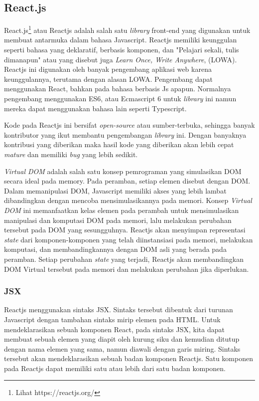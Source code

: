\subsection{React.js}
    React.js\footnote{Lihat https://reactjs.org/} atau Reactjs adalah salah satu
    \textit{library} front-end yang digunakan untuk membuat antarmuka
    \cite{facebook:react-homepage} dalam bahasa Javascript. Reactjs memiliki keunggulan
    seperti bahasa yang deklaratif, berbasis komponen, dan "Pelajari sekali,
    tulis dimanapun" atau yang disebut juga \textit{Learn Once, Write Anywhere},
    (LOWA)\cite{facebook:react-homepage}. Reactjs ini digunakan oleh banyak
    pengembang aplikasi web karena keunggulannya, terutama dengan alasan LOWA.
    Pengembang dapat menggunakan React, bahkan pada bahasa berbasis Js apapun.
    Normalnya pengembang menggunakan ES6, atau Ecmascript 6 untuk
    \textit{library} ini namun mereka dapat menggunakan bahasa lain seperti
    Typescript\cite{typescript:react-ts}.
        
    Kode pada Reactjs ini bersifat \textit{open-source} atau sumber-terbuka,
    sehingga banyak kontributor yang ikut membantu pengembangan \textit{library}
    ini. Dengan banyaknya kontribusi yang diberikan maka hasil kode yang
    diberikan akan lebih cepat \textit{mature} dan memiliki \textit{bug} yang
    lebih sedikit.

    \textit{Virtual DOM} adalah salah satu konsep pemrograman yang simulasikan
    DOM secara ideal pada memory\cite{facebook:react-faq}. Pada peramban, setiap
    elemen disebut dengan DOM. Dalam memanipulasi DOM, Javascript memiliki akses
    yang lebih lambat dibandingkan dengan mencoba mensimulasikannya pada memori.
    Konsep \textit{Virtual DOM} ini memanfaatkan kelas elemen pada perambah untuk
    mensimulasikan manipulasi dan komputasi DOM pada memori, lalu melakukan perubahan
    tersebut pada DOM yang sesungguhnya.
    Reactjs akan menyimpan representasi \textit{state} dari komponen-komponen yang telah
    diinstansiasi pada memori, melakukan komputasi, dan membandingkannya dengan 
    DOM asli yang berada pada
    peramban. Setiap perubahan \textit{state} yang terjadi, Reactjs akan
    membandingkan DOM Virtual tersebut pada memori dan melakukan perubahan jika
    diperlukan.
    
    \subsubsection{JSX}
    Reactjs menggunakan sintaks JSX. Sintaks tersebut dibentuk dari turunan Javascript 
    dengan tambahan sintaks mirip elemen pada HTML. Untuk mendeklarasikan sebuah 
    komponen React, pada sintaks JSX, kita dapat membuat sebuah elemen yang diapit
    oleh kurung siku dan kemudian ditutup dengan nama elemen yang sama, namun diawali
    dengan garis miring.
    Sintaks tersebut akan mendeklarasikan sebuah badan komponen Reactjs.
    Satu komponen pada Reactjs dapat memiliki satu atau lebih dari satu badan komponen.
    
